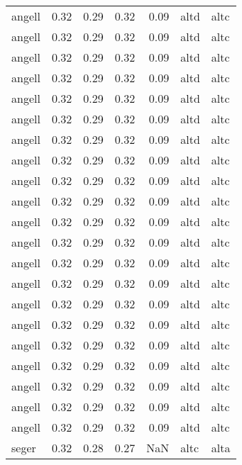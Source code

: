 \begin{tabular}{lrrrrll}
    angell &     0.32 &     0.29 &     0.32 &     0.09 &      altd &     altc \\
    angell &     0.32 &     0.29 &     0.32 &     0.09 &      altd &     altc \\
    angell &     0.32 &     0.29 &     0.32 &     0.09 &      altd &     altc \\
    angell &     0.32 &     0.29 &     0.32 &     0.09 &      altd &     altc \\
    angell &     0.32 &     0.29 &     0.32 &     0.09 &      altd &     altc \\
    angell &     0.32 &     0.29 &     0.32 &     0.09 &      altd &     altc \\
    angell &     0.32 &     0.29 &     0.32 &     0.09 &      altd &     altc \\
    angell &     0.32 &     0.29 &     0.32 &     0.09 &      altd &     altc \\
    angell &     0.32 &     0.29 &     0.32 &     0.09 &      altd &     altc \\
    angell &     0.32 &     0.29 &     0.32 &     0.09 &      altd &     altc \\
    angell &     0.32 &     0.29 &     0.32 &     0.09 &      altd &     altc \\
    angell &     0.32 &     0.29 &     0.32 &     0.09 &      altd &     altc \\
    angell &     0.32 &     0.29 &     0.32 &     0.09 &      altd &     altc \\
    angell &     0.32 &     0.29 &     0.32 &     0.09 &      altd &     altc \\
    angell &     0.32 &     0.29 &     0.32 &     0.09 &      altd &     altc \\
    angell &     0.32 &     0.29 &     0.32 &     0.09 &      altd &     altc \\
    angell &     0.32 &     0.29 &     0.32 &     0.09 &      altd &     altc \\
    angell &     0.32 &     0.29 &     0.32 &     0.09 &      altd &     altc \\
    angell &     0.32 &     0.29 &     0.32 &     0.09 &      altd &     altc \\
    angell &     0.32 &     0.29 &     0.32 &     0.09 &      altd &     altc \\
    angell &     0.32 &     0.29 &     0.32 &     0.09 &      altd &     altc \\
     seger &     0.32 &     0.28 &     0.27 &      NaN &      altc &     alta \\

\end{tabular}
